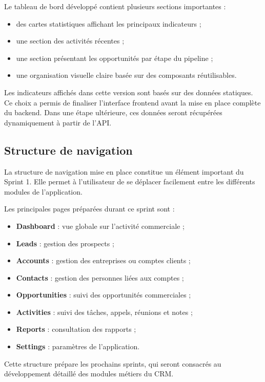 \documentclass[12pt,a4paper]{report}
\begin{document}
Le tableau de bord développé contient plusieurs sections importantes :

\begin{itemize}
    \item des cartes statistiques affichant les principaux indicateurs ;
    \item une section des activités récentes ;
    \item une section présentant les opportunités par étape du pipeline ;
    \item une organisation visuelle claire basée sur des composants réutilisables.
\end{itemize}

Les indicateurs affichés dans cette version sont basés sur des données statiques. Ce choix a permis de finaliser l’interface frontend avant la mise en place complète du backend. Dans une étape ultérieure, ces données seront récupérées dynamiquement à partir de l’API.

\subsection{Structure de navigation}

La structure de navigation mise en place constitue un élément important du Sprint 1. Elle permet à l’utilisateur de se déplacer facilement entre les différents modules de l’application.

Les principales pages préparées durant ce sprint sont :

\begin{itemize}
    \item \textbf{Dashboard} : vue globale sur l’activité commerciale ;
    \item \textbf{Leads} : gestion des prospects ;
    \item \textbf{Accounts} : gestion des entreprises ou comptes clients ;
    \item \textbf{Contacts} : gestion des personnes liées aux comptes ;
    \item \textbf{Opportunities} : suivi des opportunités commerciales ;
    \item \textbf{Activities} : suivi des tâches, appels, réunions et notes ;
    \item \textbf{Reports} : consultation des rapports ;
    \item \textbf{Settings} : paramètres de l’application.
\end{itemize}

Cette structure prépare les prochains sprints, qui seront consacrés au développement détaillé des modules métiers du CRM.
\end{document}
